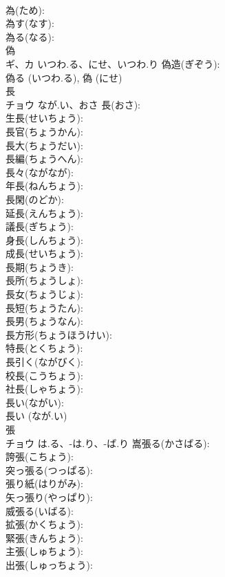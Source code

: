 \documentclass[8pt]{extreport}
\begin{document}
\begin{CJK}{UTF8}{min}
\\	為(ため): 
\\	為す(なす): 
\\	為る(なる): 
\\	偽			
\\	ギ、カ	いつわ.る、にせ、いつわ.り	偽造(ぎぞう): 
\\	偽る (いつわ.る), 偽 (にせ)
\\	長			
\\	チョウ	なが.い、おさ	長(おさ): 
\\	生長(せいちょう): 
\\	長官(ちょうかん): 
\\	長大(ちょうだい): 
\\	長編(ちょうへん): 
\\	長々(ながなが): 
\\	年長(ねんちょう): 
\\	長閑(のどか): 
\\	延長(えんちょう): 
\\	議長(ぎちょう): 
\\	身長(しんちょう): 
\\	成長(せいちょう): 
\\	長期(ちょうき): 
\\	長所(ちょうしょ): 
\\	長女(ちょうじょ): 
\\	長短(ちょうたん): 
\\	長男(ちょうなん): 
\\	長方形(ちょうほうけい): 
\\	特長(とくちょう): 
\\	長引く(ながびく): 
\\	校長(こうちょう): 
\\	社長(しゃちょう): 
\\	長い(ながい): 
\\	長い (なが.い)
\\	張			
\\	チョウ	は.る、-は.り、-ば.り	嵩張る(かさばる): 
\\	誇張(こちょう): 
\\	突っ張る(つっぱる): 
\\	張り紙(はりがみ): 
\\	矢っ張り(やっぱり): 
\\	威張る(いばる): 
\\	拡張(かくちょう): 
\\	緊張(きんちょう): 
\\	主張(しゅちょう): 
\\	出張(しゅっちょう): 

\end{CJK}
\end{document}
